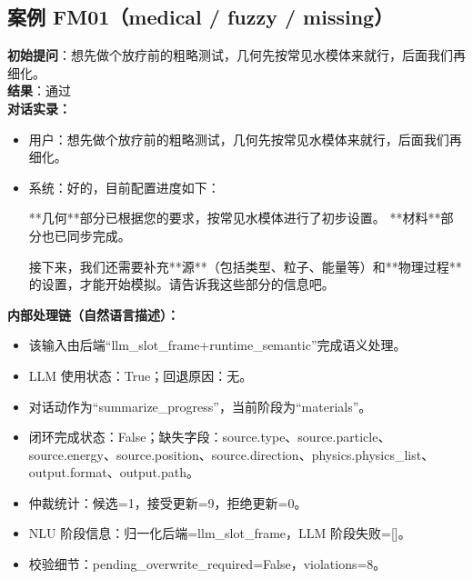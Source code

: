 \documentclass[11pt]{ctexart}
\begin{document}
\subsection{案例 FM01（medical / fuzzy / missing）}
\textbf{初始提问}：想先做个放疗前的粗略测试，几何先按常见水模体来就行，后面我们再细化。\\
\textbf{结果}：通过\\
\textbf{对话实录：}
\begin{itemize}
\item 用户：想先做个放疗前的粗略测试，几何先按常见水模体来就行，后面我们再细化。
\item 系统：好的，目前配置进度如下：

**几何**部分已根据您的要求，按常见水模体进行了初步设置。
**材料**部分也已同步完成。

接下来，我们还需要补充**源**（包括类型、粒子、能量等）和**物理过程**的设置，才能开始模拟。请告诉我这些部分的信息吧。
\end{itemize}
\textbf{内部处理链（自然语言描述）：}
\begin{itemize}
\item 该输入由后端“llm\_slot\_frame+runtime\_semantic”完成语义处理。
\item LLM 使用状态：True；回退原因：无。
\item 对话动作为“summarize\_progress”，当前阶段为“materials”。
\item 闭环完成状态：False；缺失字段：source.type、source.particle、source.energy、source.position、source.direction、physics.physics\_list、output.format、output.path。
\item 仲裁统计：候选=1，接受更新=9，拒绝更新=0。
\item NLU 阶段信息：归一化后端=llm\_slot\_frame，LLM 阶段失败=[]。
\item 校验细节：pending\_overwrite\_required=False，violations=8。
\end{itemize}
\end{document}
